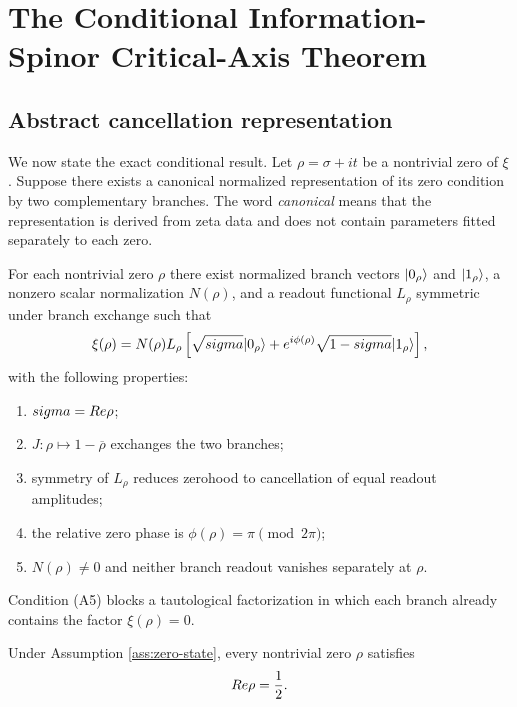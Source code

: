 \chapter{The Conditional Information-Spinor Critical-Axis Theorem}
\label{ch:conditional}

\section{Abstract cancellation representation}
We now state the exact conditional result. Let $\rho=\sigma+it$ be a nontrivial zero of $\xi$. Suppose there exists a canonical normalized representation of its zero condition by two complementary branches. The word \emph{canonical} means that the representation is derived from zeta data and does not contain parameters fitted separately to each zero.

\begin{assumption}
\label{ass:zero-state}
For each nontrivial zero $\rho$ there exist normalized branch vectors $\lvert 0_\rho\rangle$ and $\lvert 1_\rho\rangle$, a nonzero scalar normalization $N(\rho)$, and a readout functional $L_\rho$ symmetric under branch exchange such that
\begin{equation}
\xi(\rho)=N(\rho)L_\rho\left[
\sqrt{sigma}\lvert 0_\rho\rangle
+e^{i\phi(\rho)}\sqrt{1-sigma}\lvert 1_\rho\rangle
\right],
\label{eq:zero-rep}
\end{equation}
with the following properties:
\begin{enumerate}[label=(A\arabic*)]
\item $sigma=Re\rho$;
\item $J:\rho\mapsto1-\overline\rho$ exchanges the two branches;
\item symmetry of $L_\rho$ reduces zerohood to cancellation of equal readout amplitudes;
\item the relative zero phase is $\phi(\rho)=\pi\pmod{2\pi}$;
\item $N(\rho)\neq0$ and neither branch readout vanishes separately at $\rho$.
\end{enumerate}
\end{assumption}

Condition (A5) blocks a tautological factorization in which each branch already contains the factor $\xi(\rho)=0$.

\begin{theorem}
\label{thm:conditional}
Under Assumption \ref{ass:zero-state}, every nontrivial zero $\rho$ satisfies
\begin{equation}
Re\rho=\frac12.
\end{equation}
\end{theorem}

